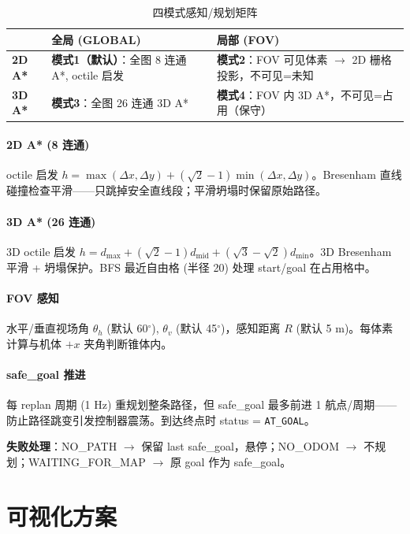 \documentclass[12pt,a4paper]{article}
\begin{document}
\begin{table}[H]
\centering
\caption{四模式感知/规划矩阵}
\label{tab:fourmodes}
\small
\begin{tabularx}{\textwidth}{l X X}
\toprule
  & \textbf{全局 (GLOBAL)} & \textbf{局部 (FOV)} \\
\midrule
\textbf{2D A*} & \textbf{模式1（默认）}：全图 8 连通 A*, octile 启发&
  \textbf{模式2}：FOV 可见体素 $\to$ 2D 栅格投影，不可见=未知 \\
\textbf{3D A*} & \textbf{模式3}：全图 26 连通 3D A* &
  \textbf{模式4}：FOV 内 3D A*，不可见=占用（保守） \\
\bottomrule
\end{tabularx}
\end{table}

\paragraph{2D A* (8 连通)} octile 启发 $h = \max(\Delta x,\Delta y) + (\sqrt{2}-1)\min(\Delta x,\Delta y)$。Bresenham 直线碰撞检查平滑——只跳掉安全直线段；平滑坍塌时保留原始路径。

\paragraph{3D A* (26 连通)} 3D octile 启发 $h = d_{\max} + (\sqrt{2}-1)d_{\text{mid}} + (\sqrt{3}-\sqrt{2})d_{\min}$。3D Bresenham 平滑 + 坍塌保护。BFS 最近自由格 (半径 20) 处理 start/goal 在占用格中。

\paragraph{FOV 感知} 水平/垂直视场角 $\theta_h$ (默认 60$^\circ$), $\theta_v$ (默认 45$^\circ$)，感知距离 $R$ (默认 5 m)。每体素计算与机体 $+x$ 夹角判断锥体内。

\paragraph{safe\_goal 推进} 每 replan 周期 (1 Hz) 重规划整条路径，但 safe\_goal 最多前进 1 航点/周期——防止路径跳变引发控制器震荡。到达终点时 status = \texttt{AT\_GOAL}。

\textbf{失败处理}：NO\_PATH $\to$ 保留 last safe\_goal，悬停；NO\_ODOM $\to$ 不规划；WAITING\_FOR\_MAP $\to$ 原 goal 作为 safe\_goal。


\section{可视化方案}
\end{document}
